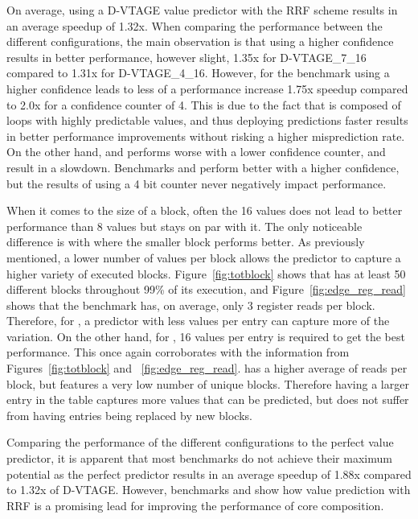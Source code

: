 On average, using a D-VTAGE value predictor with the RRF scheme results in an average speedup of 1.32x.
When comparing the performance between the different configurations, the main observation is that using a higher confidence results in better performance, however slight, 1.35x for D-VTAGE\_7\_16 compared to 1.31x for D-VTAGE\_4\_16.
However, for the benchmark  using a higher confidence leads to less of a performance increase 1.75x speedup compared to 2.0x for a confidence counter of 4.
This is due to the fact that  is composed of loops with highly predictable values, and thus deploying predictions faster results in better performance improvements without risking a higher misprediction rate.
On the other hand,  and  performs worse with a lower confidence counter, and result in a slowdown.
Benchmarks  and  perform better with a higher confidence, but the results of using a 4 bit counter never negatively impact performance.

When it comes to the size of a block, often the 16 values does not lead to better performance than 8 values but stays on par with it.
The only noticeable difference is with  where the smaller block performs better.
As previously mentioned, a lower number of values per block allows the predictor to capture a higher variety of executed blocks.
Figure~\ref{fig:totblock} shows that  has at least 50 different blocks throughout 99\% of its execution, and Figure~\ref{fig:edge_reg_read} shows that the benchmark has, on average, only 3 register reads per block.
Therefore, for , a predictor with less values per entry can capture more of the variation.
On the other hand, for , 16 values per entry is required to get the best performance.
This once again corroborates with the information from Figures~\ref{fig:totblock} and ~\ref{fig:edge_reg_read}.
 has a higher average of reads per block, but features a very low number of unique blocks.
Therefore having a larger entry in the table captures more values that can be predicted, but does not suffer from having entries being replaced by new blocks.

Comparing the performance of the different configurations to the perfect value predictor, it is apparent that most benchmarks do not achieve their maximum potential as the perfect predictor results in an average speedup of 1.88x compared to 1.32x of D-VTAGE.
However, benchmarks  and  show how value prediction with RRF is a promising lead for improving the performance of core composition.

